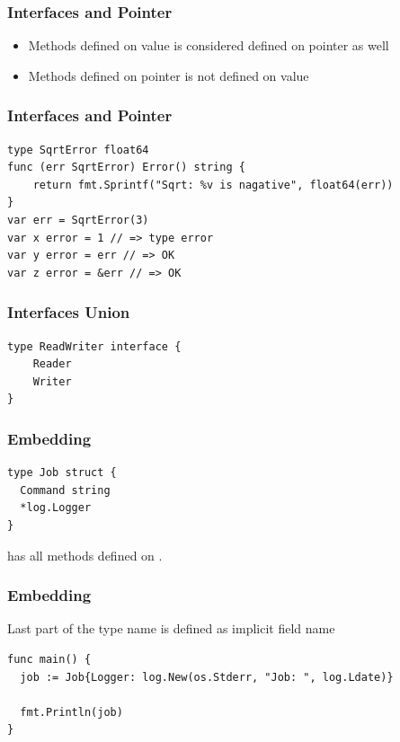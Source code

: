\documentclass[xetex,mathserif,serif,12pt]{beamer}
\begin{document}
\begin{frame}
  \frametitle{Interfaces and Pointer}

  \begin{itemize}
  \item Methods defined on value is considered defined on pointer as well
  \item Methods defined on pointer is not defined on value
  \end{itemize}
\end{frame}

\begin{frame}[fragile]
  \frametitle{Interfaces and Pointer}

  \begin{beamer@nomargin}
    \begin{lstlisting}
type SqrtError float64
func (err SqrtError) Error() string {
	return fmt.Sprintf("Sqrt: %v is nagative", float64(err))
}
var err = SqrtError(3)
var x error = 1 // => type error
var y error = err // => OK
var z error = &err // => OK
    \end{lstlisting}
  \end{beamer@nomargin}
\end{frame}


\begin{frame}[fragile]
  \frametitle{Interfaces Union}

  \begin{beamer@nomargin}
    \begin{lstlisting}
type ReadWriter interface {
    Reader
    Writer
}
    \end{lstlisting}
  \end{beamer@nomargin}
\end{frame}

\begin{frame}[fragile]
  \frametitle{Embedding}

  \begin{beamer@nomargin}
    \begin{lstlisting}
type Job struct {
  Command string
  *log.Logger
}
    \end{lstlisting}
  \end{beamer@nomargin}

   has all methods defined on .
\end{frame}

\begin{frame}[fragile]
  \frametitle{Embedding}
  Last part of the type name is defined as implicit field name

  \begin{beamer@nomargin}
    \begin{lstlisting}
func main() {
  job := Job{Logger: log.New(os.Stderr, "Job: ", log.Ldate)}

  fmt.Println(job)
}
    \end{lstlisting}
  \end{beamer@nomargin}
\end{frame}
\end{document}
